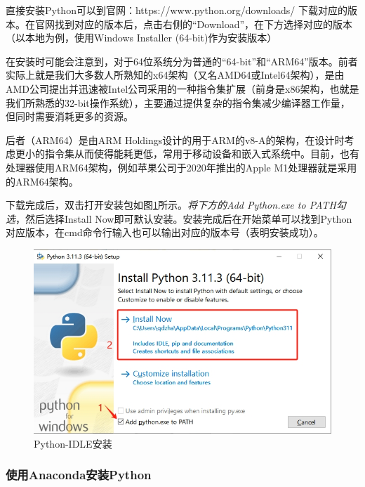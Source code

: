 直接安装Python可以到官网：https://www.python.org/downloads/ 下载对应的版本。在官网找到对应的版本后，点击右侧的“Download”，在下方选择对应的版本（以本地为例，使用Windows Installer (64-bit)作为安装版本）

\begin{extend}
    在安装时可能会注意到，对于64位系统分为普通的“64-bit”和“ARM64”版本。前者实际上就是我们大多数人所熟知的x64架构（又名AMD64或Intel64架构），是由AMD公司提出并迅速被Intel公司采用的一种指令集扩展（前身是x86架构，也就是我们所熟悉的32-bit操作系统），主要通过提供复杂的指令集减少编译器工作量，但同时需要消耗更多的资源。

    后者（ARM64）是由ARM Holdings设计的用于ARM的v8-A的架构，在设计时考虑更小的指令集从而使得能耗更低，常用于移动设备和嵌入式系统中。目前，也有处理器使用ARM64架构，例如苹果公司于2020年推出的Apple M1处理器就是采用的ARM64架构。
\end{extend}

下载完成后，双击打开安装包如图\ref{fig:安装Python-Python-IDLE安装}所示。\emph{将下方的Add Python.exe to PATH勾选}，然后选择Install Now即可默认安装。安装完成后在开始菜单可以找到Python对应版本，在cmd命令行输入也可以输出对应的版本号（表明安装成功）。

\begin{figure}
    \centering
    \includegraphics[width=1\linewidth]{Python与机器学习/基础Python语法/安装Python/fig/Python-IDLE安装.png}
    \caption{Python-IDLE安装}
    \label{fig:安装Python-Python-IDLE安装}
\end{figure}

\subsubsection{使用Anaconda安装Python}


